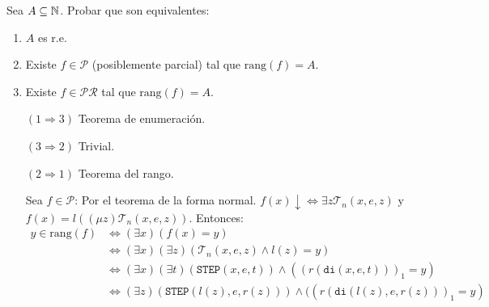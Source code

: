 \documentclass[twoside]{article}
\begin{document}
\begin{ejercicio}{5}
Sea $A \subseteq \mathbb{N}$. Probar que son equivalentes:
\begin{enumerate}
	\item $A$ es r.e.
	\item Existe $f \in \mathcal{P}$ (posiblemente parcial) tal que $\text{rang}(f) = A$.
	\item Existe $f \in \mathcal{P}\mathcal{R}$ tal que $\text{rang}(f)=A$.
\end{enumerate}
\end{ejercicio}
\begin{solucion}\mbox{}
\begin{itemize}
	\item[$(1\Rightarrow 3)$] Teorema de enumeración.
	\item[$(3\Rightarrow 2)$] Trivial.
	\item[$(2\Rightarrow 1)$] Teorema del rango.
	
	Sea $f \in \mathcal{P}$: Por el teorema de la forma normal. $f(x)\!\downarrow \Leftrightarrow \exists z \mathcal{T}_n(x,e,z)$ y $f(x) = l((μz)\mathcal{T}_n(x,e,z))$.
	Entonces:
	\begin{align*}
	y \in \text{rang}(f) & \Leftrightarrow (\exists x) (f(x)=y)\\
	& \Leftrightarrow (\exists x)(\exists z) (\mathcal{T}_n(x,e,z) \land l(z) = y)\\
	& \Leftrightarrow (\exists x) (\exists t) (\texttt{STEP}(x,e,t)) \land ((r(\texttt{di}(x,e,t)))_1 = y)\\
	& \Leftrightarrow (\exists z) (\texttt{STEP}(l(z),e,r(z))) \land ((r(\texttt{di}(l(z),e,r(z)))_1 = y)
\end{align*}
\end{itemize}
\end{solucion}

\newpage
\end{document}
